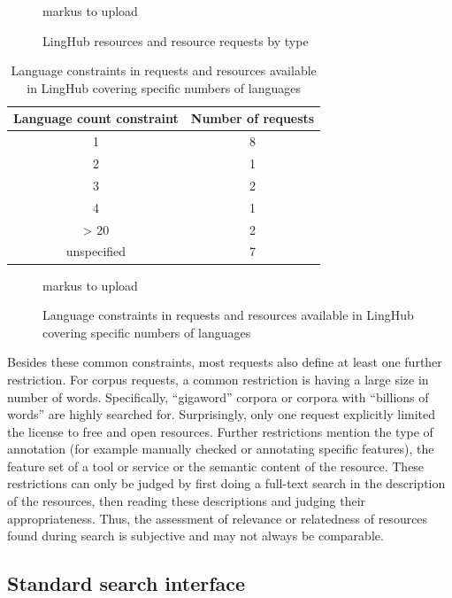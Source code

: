 \documentclass[smallextended]{svjour3}       %
\begin{document}
\begin{figure}
    markus to upload
    \caption{\label{fig:req-by-type}LingHub resources and resource requests by
type}
\end{figure}

\begin{table}
    \begin{tabular}{c|c}
    Language count constraint & Number of requests \\
    \hline
    1                         & 8                  \\
    2                         & 1                  \\
    3                         & 2                  \\
    4                         & 1                  \\
    > 20                      & 2                  \\
    unspecified               & 7                  \\
\end{tabular}
    \caption{\label{tab:language-constraints}  Language constraints in requests
        and resources available in LingHub covering specific numbers of
    languages}
\end{table}

\begin{figure}
    markus to upload
    \caption{\label{fig:language-constraints} Language constraints in requests
        and resources available in LingHub covering specific numbers of
    languages}
\end{figure}

Besides these common constraints, most requests also define at least one further
restriction. For corpus requests, a common restriction is having a large size in
number of words. Specifically, “gigaword” corpora or corpora with “billions of
words” are highly searched for. Surprisingly, only one request explicitly
limited the license to free and open resources. Further restrictions mention the
type of annotation (for example manually checked or annotating specific
features), the feature set of a tool or service or the semantic content of the
resource. These restrictions can only be judged by first doing a full-text
search in the description of the resources, then reading these descriptions and
judging their appropriateness. Thus, the assessment of relevance or relatedness
of resources found during search is subjective and may not always be comparable.


\subsection{Standard search interface}
\end{document}
